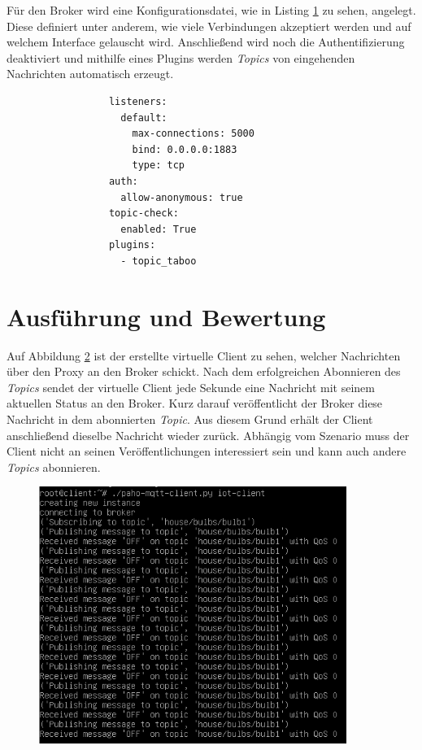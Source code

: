     Für den Broker wird eine Konfigurationsdatei, wie in Listing \ref{fig:broker_config} zu sehen, angelegt. Diese definiert unter anderem, wie viele Verbindungen akzeptiert werden und auf welchem Interface gelauscht wird. Anschließend wird noch die Authentifizierung deaktiviert und mithilfe eines Plugins werden \emph{Topics} von eingehenden Nachrichten automatisch erzeugt. 
    \begin{figure}[h]
        \begin{lstlisting}
            listeners:
              default:
                max-connections: 5000
                bind: 0.0.0.0:1883
                type: tcp
            auth:
              allow-anonymous: true
            topic-check:
              enabled: True
            plugins:
              - topic_taboo
        \end{lstlisting}
        \label{fig:broker_config}
    \end{figure}

\section{Ausführung und Bewertung}
    Auf Abbildung \ref{fig:client_messages} ist der erstellte virtuelle Client zu sehen, welcher Nachrichten über den Proxy an den Broker schickt.
    Nach dem erfolgreichen Abonnieren des \emph{Topics} sendet der virtuelle Client jede Sekunde eine Nachricht mit seinem aktuellen Status an den Broker. Kurz darauf veröffentlicht der Broker diese Nachricht in dem abonnierten \emph{Topic}. Aus diesem Grund erhält der Client anschließend dieselbe Nachricht wieder zurück. Abhängig vom Szenario muss der Client nicht an seinen Veröffentlichungen interessiert sein und kann auch andere \emph{Topics} abonnieren.
    \begin{figure}[!h]%
        \centering
        \includegraphics[width=10cm]{tex/bilder/6_validierung/ClientMessages.png}
        \label{fig:client_messages}
    \end{figure}
    
